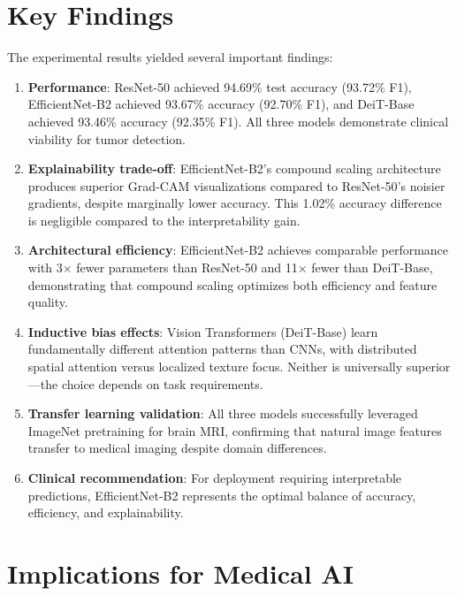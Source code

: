 \section{Key Findings}

The experimental results yielded several important findings:

\begin{enumerate}
    \item \textbf{Performance}: ResNet-50 achieved 94.69\% test accuracy (93.72\% F1), EfficientNet-B2 achieved 93.67\% accuracy (92.70\% F1), and DeiT-Base achieved 93.46\% accuracy (92.35\% F1). All three models demonstrate clinical viability for tumor detection.

    \item \textbf{Explainability trade-off}: EfficientNet-B2's compound scaling architecture produces superior Grad-CAM visualizations compared to ResNet-50's noisier gradients, despite marginally lower accuracy. This 1.02\% accuracy difference is negligible compared to the interpretability gain.

    \item \textbf{Architectural efficiency}: EfficientNet-B2 achieves comparable performance with 3× fewer parameters than ResNet-50 and 11× fewer than DeiT-Base, demonstrating that compound scaling optimizes both efficiency and feature quality.

    \item \textbf{Inductive bias effects}: Vision Transformers (DeiT-Base) learn fundamentally different attention patterns than CNNs, with distributed spatial attention versus localized texture focus. Neither is universally superior---the choice depends on task requirements.

    \item \textbf{Transfer learning validation}: All three models successfully leveraged ImageNet pretraining for brain MRI, confirming that natural image features transfer to medical imaging despite domain differences.

    \item \textbf{Clinical recommendation}: For deployment requiring interpretable predictions, EfficientNet-B2 represents the optimal balance of accuracy, efficiency, and explainability.
\end{enumerate}

\section{Implications for Medical AI}

